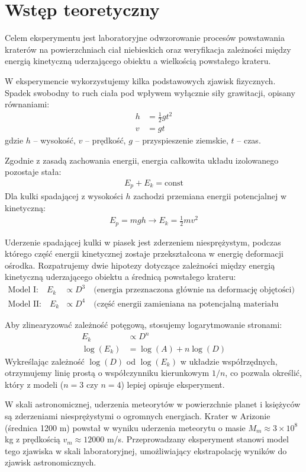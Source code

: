 \section{Wstęp teoretyczny}

Celem eksperymentu jest laboratoryjne odwzorowanie procesów powstawania kraterów na powierzchniach ciał niebieskich oraz weryfikacja zależności między energią kinetyczną uderzającego obiektu a wielkością powstałego krateru.

W eksperymencie wykorzystujemy kilka podstawowych zjawisk fizycznych. Spadek swobodny to ruch ciała pod wpływem wyłącznie siły grawitacji, opisany równaniami:
\begin{align*}
    h &= \frac{1}{2}gt^2 \\
    v &= gt
\end{align*}
gdzie $h$ -- wysokość, $v$ -- prędkość, $g$ -- przyspieszenie ziemskie, $t$ -- czas.

Zgodnie z zasadą zachowania energii, energia całkowita układu izolowanego pozostaje stała:
\begin{align*}
    E_p + E_k = \text{const}
\end{align*}
Dla kulki spadającej z wysokości $h$ zachodzi przemiana energii potencjalnej w kinetyczną:
\begin{align*}
    E_p = mgh \rightarrow E_k = \frac{1}{2}mv^2
\end{align*}

Uderzenie spadającej kulki w piasek jest zderzeniem niesprężystym, podczas którego część energii kinetycznej zostaje przekształcona w energię deformacji ośrodka. Rozpatrujemy dwie hipotezy dotyczące zależności między energią kinetyczną uderzającego obiektu a średnicą powstałego krateru:
\begin{align*}
    \text{Model I:} \quad E_k &\propto D^3 \quad \text{(energia przeznaczona głównie na deformację objętości)} \\
    \text{Model II:} \quad E_k &\propto D^4 \quad \text{(część energii zamieniana na potencjalną materiału wyrzuconego)}
\end{align*}

Aby zlinearyzować zależność potęgową, stosujemy logarytmowanie stronami:
\begin{align*}
    E_k &\propto D^n \\
    \log(E_k) &= \log(A) + n\log(D)
\end{align*}
Wykreślając zależność $\log(D)$ od $\log(E_k)$ w układzie współrzędnych, otrzymujemy linię prostą o współczynniku kierunkowym $1/n$, co pozwala określić, który z modeli ($n=3$ czy $n=4$) lepiej opisuje eksperyment.

W skali astronomicznej, uderzenia meteorytów w powierzchnie planet i księżyców są zderzeniami niesprężystymi o ogromnych energiach. Krater w Arizonie (średnica 1200 m) powstał w wyniku uderzenia meteorytu o masie $M_m \approx 3 \times 10^8$ kg z prędkością $v_m \approx 12000$ m/s. Przeprowadzany eksperyment stanowi model tego zjawiska w skali laboratoryjnej, umożliwiający ekstrapolację wyników do zjawisk astronomicznych.
